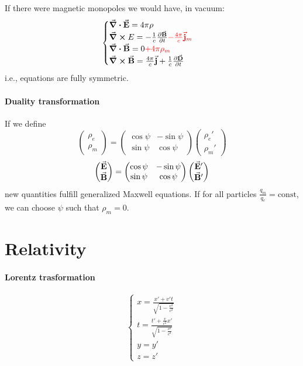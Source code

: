 If there were magnetic monopoles we would have, in vacuum:
$$\begin{cases}
	\div{\va{E}} = 4\pi \rho\\
	\curl{E} = -\frac{1}{c} \pdv{\va{B}}{t} \textcolor{red}{-\frac{4\pi}{c}\va{j}_m} \\
	\div{\va{B}} = 0\textcolor{red}{+4\pi \rho_m}\\
	\curl{\va{B}} = \frac{4\pi}{c} \va{j} + \frac{1}{c}\pdv{\va{D}}{t}
\end{cases}$$
i.e., equations are fully symmetric.
\paragraph{Duality transformation}
If we define 
$$\begin{pmatrix}
\rho_e\\\rho_m
\end{pmatrix} = \begin{pmatrix}
\cos \psi&-\sin \psi\\\sin \psi&\cos \psi
\end{pmatrix}\begin{pmatrix}
\rho_e'\\\rho_m'
\end{pmatrix}$$
$$\begin{pmatrix}
\va{E}\\\va{B}
\end{pmatrix} = \begin{pmatrix}
\cos \psi&-\sin \psi\\\sin \psi&\cos \psi
\end{pmatrix}\begin{pmatrix}
\va{E}'\\\va{B}'
\end{pmatrix}$$
new quantities fulfill generalized Maxwell equations. If for all particles $\frac{q_m}{q_e} = \text{const}$, we can choose $\psi$ such that $\rho_m = 0$.

\section{Relativity}
\paragraph{Lorentz trasformation}
$$\begin{cases}
x = \frac{x'+v't}{\sqrt{1-\frac{v^2}{c^2}}}\\
t = \frac{t'+\frac{v}{c^2}x'}{\sqrt{1-\frac{v^2}{c^2}}}\\
y=y'\\
z=z'
\end{cases}$$
